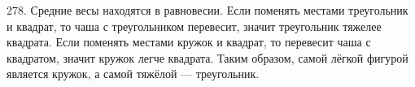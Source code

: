 278. Средние весы находятся в равновесии. Если поменять местами треугольник и квадрат, то чаша с треугольником перевесит, значит треугольник тяжелее квадрата. Если поменять местами кружок и квадрат, то перевесит чаша с квадратом, значит кружок легче квадрата. Таким образом, самой лёгкой фигурой является кружок, а самой тяжёлой --- треугольник.\\
